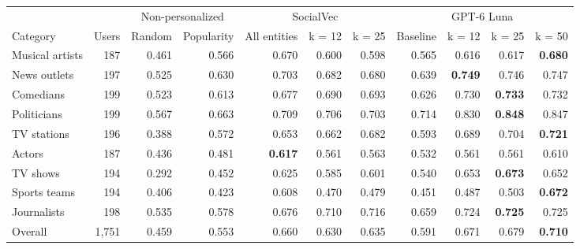 \begin{tabular}{lrrrrrrrrrr}
\toprule
 &  & \multicolumn{2}{c}{Non-personalized} & \multicolumn{3}{c}{SocialVec} & \multicolumn{4}{c}{GPT-6 Luna} \\
Category & Users & Random & Popularity & All entities & k = 12 & k = 25 & Baseline & k = 12 & k = 25 & k = 50 \\
\midrule
Musical artists & 187 & 0.461 & 0.566 & 0.670 & 0.600 & 0.598 & 0.565 & 0.616 & 0.617 & \textbf{0.680} \\
News outlets & 197 & 0.525 & 0.630 & 0.703 & 0.682 & 0.680 & 0.639 & \textbf{0.749} & 0.746 & 0.747 \\
Comedians & 199 & 0.523 & 0.613 & 0.677 & 0.690 & 0.693 & 0.626 & 0.730 & \textbf{0.733} & 0.732 \\
Politicians & 199 & 0.567 & 0.663 & 0.709 & 0.706 & 0.703 & 0.714 & 0.830 & \textbf{0.848} & 0.847 \\
TV stations & 196 & 0.388 & 0.572 & 0.653 & 0.662 & 0.682 & 0.593 & 0.689 & 0.704 & \textbf{0.721} \\
Actors & 187 & 0.436 & 0.481 & \textbf{0.617} & 0.561 & 0.563 & 0.532 & 0.561 & 0.561 & 0.610 \\
TV shows & 194 & 0.292 & 0.452 & 0.625 & 0.585 & 0.601 & 0.540 & 0.653 & \textbf{0.673} & 0.652 \\
Sports teams & 194 & 0.406 & 0.423 & 0.608 & 0.470 & 0.479 & 0.451 & 0.487 & 0.503 & \textbf{0.672} \\
Journalists & 198 & 0.535 & 0.578 & 0.676 & 0.710 & 0.716 & 0.659 & 0.724 & \textbf{0.725} & 0.725 \\
\midrule
Overall & 1,751 & 0.459 & 0.553 & 0.660 & 0.630 & 0.635 & 0.591 & 0.671 & 0.679 & \textbf{0.710} \\
\bottomrule
\end{tabular}
